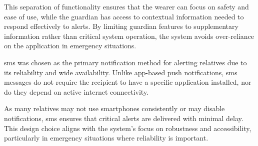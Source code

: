 This separation of functionality ensures that the wearer can focus on safety and ease of use, while the guardian has access to contextual information needed to respond effectively to alerts. By limiting guardian features to supplementary information rather than critical system operation, the system avoids over-reliance on the application in emergency situations.

\gls{sms} was chosen as the primary notification method for alerting relatives due to its reliability and wide availability. Unlike app-based push notifications, \gls{sms} messages do not require the recipient to have a specific application installed, nor do they depend on active internet connectivity. 

As many relatives may not use smartphones consistently or may disable notifications, \gls{sms} ensures that critical alerts are delivered with minimal delay. This design choice aligns with the system’s focus on robustness and accessibility, particularly in emergency situations where reliability is important.